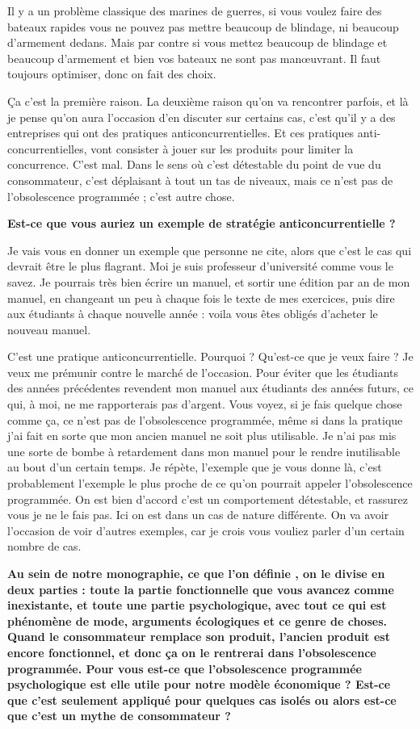 \begin{small}
Il y a un problème classique des marines de guerres, si vous voulez faire des bateaux rapides vous ne pouvez pas mettre beaucoup de blindage, ni beaucoup d'armement dedans. Mais par contre si vous mettez beaucoup de blindage et beaucoup d'armement et bien vos bateaux ne sont pas manœuvrant. Il faut toujours optimiser, donc on fait des choix. 

Ça c'est la première raison. La deuxième raison qu'on va rencontrer parfois, et là je pense qu'on aura l'occasion d'en discuter sur certains cas, c'est qu'il y a  des entreprises qui ont des pratiques anticoncurrentielles. Et ces pratiques anti-concurrentielles, vont consister à jouer sur les produits pour limiter la concurrence. C'est mal. Dans le sens où c'est détestable du point de vue du consommateur, c'est déplaisant à tout un tas de niveaux, mais ce n'est pas de l'obsolescence programmée ; c'est autre chose.

\smallbreak\textbf{Est-ce que vous auriez un exemple de stratégie anticoncurrentielle ?
}\smallbreak

 Je vais vous en donner un exemple que personne ne cite, alors que c'est le cas qui devrait être le plus flagrant. Moi je suis professeur d'université comme vous le savez. Je pourrais très bien écrire un manuel, et sortir une édition par an de mon manuel, en changeant un peu à chaque fois le texte de mes exercices, puis dire aux étudiants à chaque nouvelle année  : voila vous êtes obligés d'acheter le nouveau manuel. 


C'est une pratique anticoncurrentielle. Pourquoi ? Qu'est-ce que je veux faire ?  Je veux me prémunir contre le marché de l'occasion. Pour éviter que les étudiants des années précédentes revendent mon manuel aux étudiants des années futurs, ce qui, à moi, ne me rapporterais pas d'argent. Vous voyez, si je fais quelque chose comme ça, ce n'est pas de l'obsolescence programmée, même si dans la pratique j'ai fait en sorte que mon ancien manuel ne soit plus utilisable. Je n'ai pas mis une sorte de bombe à retardement dans mon manuel pour le rendre inutilisable au bout d'un certain temps. Je répète, l'exemple que je vous donne là, c'est probablement l'exemple le plus proche de ce qu'on pourrait appeler l'obsolescence programmée. On est bien d'accord c'est un comportement détestable, et rassurez vous je ne le fais pas. Ici on est dans un cas de nature différente. On va avoir l'occasion de voir d'autres exemples, car je crois vous vouliez parler d'un certain nombre de cas.

\smallbreak\textbf{
Au sein de notre monographie, ce que l'on définie \textit{\OP}, on le divise en deux parties : toute la partie fonctionnelle que vous avancez comme inexistante, et toute une partie psychologique, avec tout ce qui est phénomène de mode, arguments écologiques et ce genre de choses. Quand le consommateur remplace son produit, l'ancien produit est encore fonctionnel, et donc ça on le rentrerai dans l'obsolescence programmée. Pour vous est-ce que l'obsolescence programmée psychologique est elle utile pour notre modèle économique ? Est-ce que c'est seulement appliqué pour quelques cas isolés ou alors est-ce que c'est un mythe de consommateur ?
}\smallbreak


\end{small}
